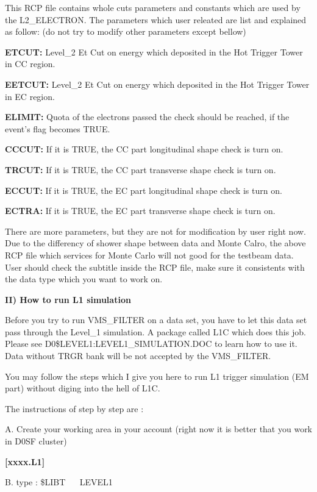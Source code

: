 This RCP file contains whole cuts parameters and constants which are used
by the L2\_ELECTRON. The parameters which user releated are 
list and explained as
follow: (do not try to modify other parameters except bellow)

{\bf   ETCUT:} Level\_2 Et Cut on energy which 
deposited in the Hot Trigger Tower in CC region.

{\bf   EETCUT:} Level\_2 Et Cut on energy which deposited 
in the Hot Trigger Tower in EC region.

{\bf   ELIMIT:} Quota of the electrons passed the check
 should be reached, if the event's flag becomes TRUE.

{\bf   CCCUT:} If it is TRUE, the CC part longitudinal shape 
check is turn on.

{\bf   TRCUT:} If it is TRUE, the CC part transverse shape 
check is turn on.

{\bf   ECCUT:} If it is TRUE, the EC part longitudinal shape 
check is turn on.

{\bf   ECTRA:} If it is TRUE, the EC part transverse shape 
check is turn on.

There are more parameters, but they are not for modification 
by user right now.
Due to the differency of shower shape between data and Monte 
Calro, the above
RCP file which services for Monte Carlo will not good for the
 testbeam data. 
User should check the subtitle inside the RCP file, make sure
 it consistents
with the data type which you want to work on.

\vskip 0.4in
\vfill\eject
\+\bf II) How to run L1 simulation\cr 

Before you try to run VMS\_FILTER on a data set, you have to let this data
set pass through the Level\_1 simulation. A package called 
L1C which does this
job. Please see D0\$LEVEL1:LEVEL1\_SIMULATION.DOC to learn 
how to use it. Data
without TRGR bank will be not accepted by the VMS\_FILTER.


You may follow the steps which I give you here to run L1 trigger simulation
(EM part) without diging into the hell of L1C.

The instructions of step by step are :

\item{A.}  Create your working area in your account (right now it is
better that you work in 
D0SF cluster)

{\bf    [xxxx.L1]}

\item{B.}  type : \$LIBT ~~ LEVEL1

